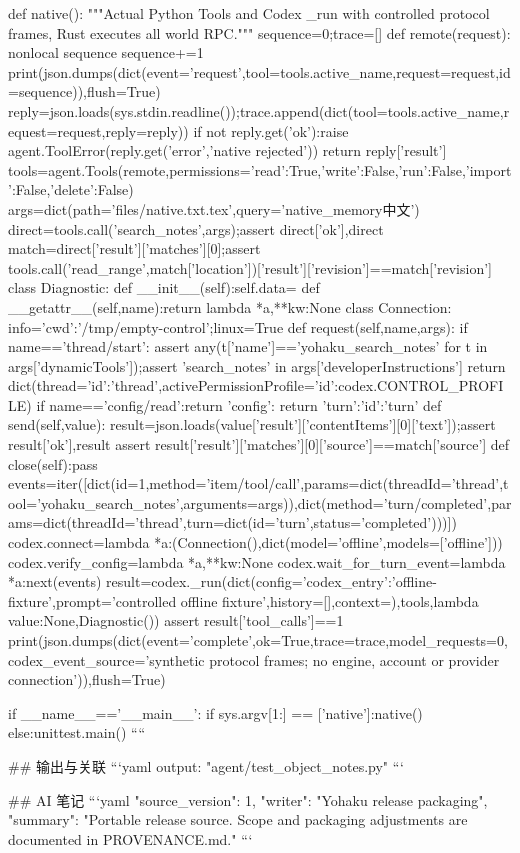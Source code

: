 def native():
    """Actual Python Tools and Codex _run with controlled protocol frames, Rust executes all world RPC."""
    sequence=0;trace=[]
    def remote(request):
        nonlocal sequence
        sequence+=1
        print(json.dumps(dict(event='request',tool=tools.active_name,request=request,id=sequence)),flush=True)
        reply=json.loads(sys.stdin.readline());trace.append(dict(tool=tools.active_name,request=request,reply=reply))
        if not reply.get('ok'):raise agent.ToolError(reply.get('error','native rejected'))
        return reply['result']
    tools=agent.Tools(remote,permissions={'read':True,'write':False,'run':False,'import':False,'delete':False})
    args=dict(path='files/native.txt.tex',query='native_memory中文')
    direct=tools.call('search_notes',args);assert direct['ok'],direct
    match=direct['result']['matches'][0];assert tools.call('read_range',match['location'])['result']['revision']==match['revision']
    class Diagnostic:
        def __init__(self):self.data={}
        def __getattr__(self,name):return lambda *a,**kw:None
    class Connection:
        info={'cwd':'/tmp/empty-control'};linux=True
        def request(self,name,args):
            if name=='thread/start':
                assert any(t['name']=='yohaku_search_notes' for t in args['dynamicTools']);assert 'search_notes' in args['developerInstructions']
                return dict(thread={'id':'thread'},activePermissionProfile={'id':codex.CONTROL_PROFILE})
            if name=='config/read':return {'config':{}}
            return {'turn':{'id':'turn'}}
        def send(self,value):
            result=json.loads(value['result']['contentItems'][0]['text']);assert result['ok'],result
            assert result['result']['matches'][0]['source']==match['source']
        def close(self):pass
    events=iter([dict(id=1,method='item/tool/call',params=dict(threadId='thread',tool='yohaku_search_notes',arguments=args)),dict(method='turn/completed',params=dict(threadId='thread',turn=dict(id='turn',status='completed')))])
    codex.connect=lambda *a:(Connection(),dict(model='offline',models=['offline']))
    codex.verify_config=lambda *a,**kw:None
    codex.wait_for_turn_event=lambda *a:next(events)
    result=codex._run(dict(config={'codex_entry':'offline-fixture'},prompt='controlled offline fixture',history=[],context={}),tools,lambda value:None,Diagnostic())
    assert result['tool_calls']==1
    print(json.dumps(dict(event='complete',ok=True,trace=trace,model_requests=0,codex_event_source='synthetic protocol frames; no engine, account or provider connection')),flush=True)

if __name__=='__main__':
    if sys.argv[1:] == ['native']:native()
    else:unittest.main()
````

## 输出与关联
```yaml
output: "agent/test_object_notes.py"
```

## AI 笔记
```yaml
{"source_version": 1, "writer": "Yohaku release packaging", "summary": "Portable release source. Scope and packaging adjustments are documented in PROVENANCE.md."}
```
